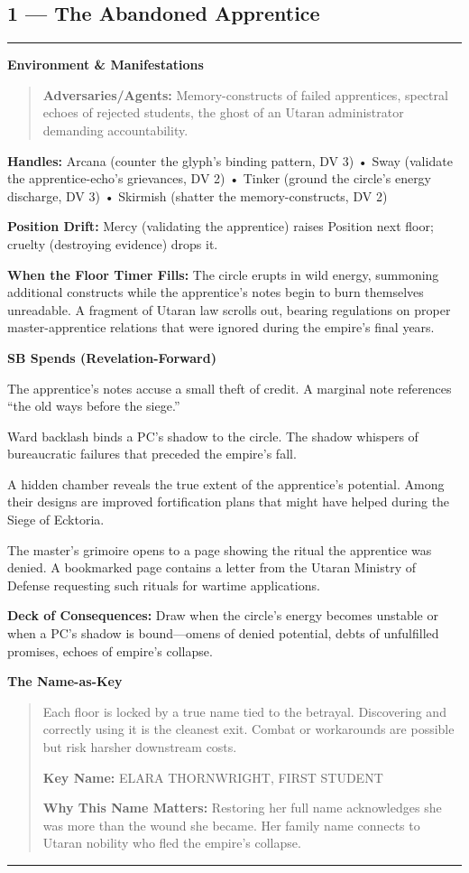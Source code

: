 \documentclass[18pt, letterpaper, twoside]{article}
\newenvironment{floorbox}[1]{%
    \begin{center}
    \begin{minipage}{0.95\textwidth}
    \subsection*{#1}
    \vspace{-0.5em}
    \rule{\textwidth}{0.5pt}
    \vspace{0.5em}
}{%
    \vspace{0.5em}
    \rule{\textwidth}{0.5pt}
    \end{minipage}
    \end{center}
}
\newenvironment{gmnote}[1]{%
    \vspace{0.5em}
    \noindent\textbf{#1}
    \begin{quote}
}{%
    \end{quote}
    \vspace{0.5em}
}
\newcommand{\handles}[1]{\noindent\textbf{Handles:} #1\par}
\newcommand{\sbitem}[2]{\item[#1 SB:] #2}
\newcommand{\deckdraw}[1]{\noindent\textbf{Deck of Consequences:} #1\par}
\newcommand{\keyname}[1]{\noindent\textbf{Key Name:} #1\par}
\newcommand{\nameimportance}[1]{\noindent\textbf{Why This Name Matters:} #1\par}
\begin{document}
\begin{floorbox}{1 --- The Abandoned Apprentice}
\begin{gmnote}{Environment \& Manifestations}
\textbf{Adversaries/Agents:} Memory-constructs of failed apprentices, spectral echoes of rejected students, the ghost of an Utaran administrator demanding accountability.
\end{gmnote}

\handles{Arcana (counter the glyph's binding pattern, DV 3) • Sway (validate the apprentice-echo's grievances, DV 2) • Tinker (ground the circle's energy discharge, DV 3) • Skirmish (shatter the memory-constructs, DV 2)}

\textbf{Position Drift:} Mercy (validating the apprentice) raises Position next floor; cruelty (destroying evidence) drops it.

\textbf{When the Floor Timer Fills:} The circle erupts in wild energy, summoning additional constructs while the apprentice's notes begin to burn themselves unreadable. A fragment of Utaran law scrolls out, bearing regulations on proper master-apprentice relations that were ignored during the empire's final years.

\textbf{SB Spends (Revelation-Forward)}
\begin{description}[leftmargin=*, style=unboxed]
    \sbitem{1}{The apprentice's notes accuse a small theft of credit. A marginal note references ``the old ways before the siege.''}
    \sbitem{2}{Ward backlash binds a PC's shadow to the circle. The shadow whispers of bureaucratic failures that preceded the empire's fall.}
    \sbitem{3}{A hidden chamber reveals the true extent of the apprentice's potential. Among their designs are improved fortification plans that might have helped during the Siege of Ecktoria.}
    \sbitem{4+}{The master's grimoire opens to a page showing the ritual the apprentice was denied. A bookmarked page contains a letter from the Utaran Ministry of Defense requesting such rituals for wartime applications.}
\end{description}

\deckdraw{Draw when the circle's energy becomes unstable or when a PC's shadow is bound---omens of denied potential, debts of unfulfilled promises, echoes of empire's collapse.}

\begin{gmnote}{The Name-as-Key}
Each floor is locked by a true name tied to the betrayal. Discovering and correctly using it is the cleanest exit. Combat or workarounds are possible but risk harsher downstream costs.

\keyname{ELARA THORNWRIGHT, FIRST STUDENT}
\nameimportance{Restoring her full name acknowledges she was more than the wound she became. Her family name connects to Utaran nobility who fled the empire's collapse.}


\end{gmnote}
\end{floorbox}
\end{document}
